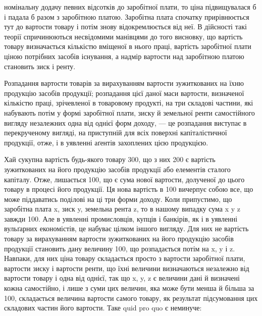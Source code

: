 \parcont{}  %
номінальну додачу певних відсотків до заробітної плати, то ціна підвищувалася
б і падала б разом з заробітною платою. Заробітна плата спочатку прирівнюється
тут до вартости товару і потім знову відокремлюється від неї.
В дійсності такі теорії спричинюються несвідомими манівцями до того висновку,
що вартість товару визначається кількістю вміщеної в нього праці, вартість заробітної
плати ціною потрібних засобів існування, а надмір вартости над заробітною
платою становить зиск і ренту.

Розпадання вартости товарів за вирахуванням вартости зужиткованих на
їхню продукцію засобів продукції; розпадання цієї даної маси вартости, визначеної
кількістю праці, зрічевленої в товаровому продукті, на три складові частини,
які набувають потім у формі заробітної плати, зиску й земельної ренти
самостійного вигляду незалежних одна від однієї форм доходу, — це розпадання
виступає в перекрученому вигляді, на приступній для всіх поверхні капіталістичної
продукції, отже, і в уявленні аґентів захоплених цією продукцією.

Хай сукупна вартість будь-якого товару \deq{} 300, що з них 200 є вартість
зужиткованих на його продукцію засобів продукції або елементів сталого
капіталу. Отже, лишається 100, що є сума нової вартости, долученої до цього
товару в процесі його продукції. Ця нова вартість в 100 вичерпує собою все,
що може піддаватись поділові на ці три форми доходу. Коли припустимо, що
заробітна плата \deq{} x, зиск \deq{} y, земельна рента \deq{} z, то в нашому випадку
сума x \dplus{} y \dplus{} z завжди \deq{} 100. Але в уявленні промисловців, купців і банкірів,
як і в уявленні вульґарних економістів, це набуває цілком іншого вигляду. Для
них не вартість товару за вирахуванням вартости зужиткованих на його продукцію
засобів продукції становить дану величину \deq{} 100, що розпадається потім
на x, y і z. Навпаки, для них ціна товару складається просто з вартости заробітної
плати, вартости зиску і вартости ренти, що їхні величини визначаються
незалежно від вартости товару і одна від однієї, так що x, y, z є величини
дані й визначені кожна самостійно, і лише з суми цих величин, яка може бути
менша й більша за 100, складається величина вартости самого товару, як результат
підсумовання цих складових частин його вартости. Таке quid pro quo
є неминуче:

